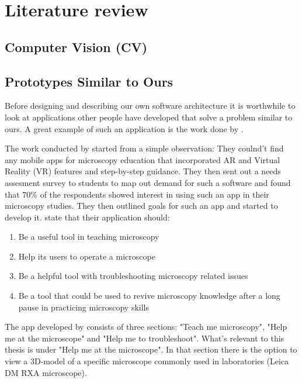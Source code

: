\chapter{Literature review} \label{Literature review}

\section{Computer Vision (CV)} \label{cv}


\section{Prototypes Similar to Ours} \label{protos}
Before designing and describing our own software architecture it is 
worthwhile to look at applications other people have developed that solve a 
problem similar to ours. A great example of such an application is the work 
done by \textcite{pylvanainen}. \par
	The work conducted by \textcite{pylvanainen} started from a simple
observation: They coulnd't find any mobile apps for microscopy education that 
incorporated AR and Virtual Reality (VR) features and step-by-step guidance. 
They then sent out a needs assesment survey to students to map out demand for 
such a software and found that 70\% of the respondents showed interest in 
using such an app in their microscopy studies.\cite{pylvanainen} They then 
outlined goals for such an app and started to develop it. 
\textcite{pylvanainen} state that their application should:
\begin{enumerate}
	\item Be a useful tool in teaching microscopy
	\item Help its users to operate a microscope
	\item Be a helpful tool with troubleshooting microscopy related issues
	\item Be a tool that could be used to revive microscopy knowledge after a long pause in practicing microscopy skills
\end{enumerate} \par
	The app developed by \textcite{pylvanainen} consists of three 
sections: "Teach me microscopy", "Help me at the microscope" and "Help me to 
troubleshoot". What's relevant to this thesis is under "Help me at the 
microscope". In that section there is the option to view a 3D-model of a 
specific microscope commonly used in laboratories (Leica DM RXA microscope). 
